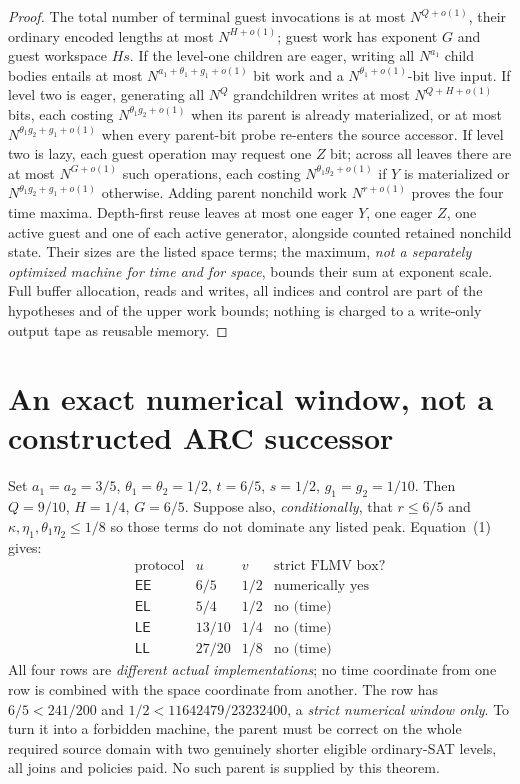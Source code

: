 \documentclass[11pt]{article}
\newcommand{\EE}{\mathsf{EE}}
\newcommand{\EL}{\mathsf{EL}}
\newcommand{\LE}{\mathsf{LE}}
\newcommand{\LL}{\mathsf{LL}}
\begin{document}
\begin{proof}
The total number of terminal guest invocations is at most
$N^{Q+o(1)}$, their ordinary encoded lengths at most
$N^{H+o(1)}$; guest work has exponent $G$ and guest workspace
$Hs$. If the level-one children are eager,
writing all $N^{a_1}$ child bodies entails at most
$N^{a_1+\theta_1+g_1+o(1)}$ bit work and a
$N^{\theta_1+o(1)}$-bit live input.
If level two is eager, generating all
$N^Q$ grandchildren writes at most $N^{Q+H+o(1)}$
bits, each costing $N^{\theta_1g_2+o(1)}$
when its parent is already materialized, or at most
$N^{\theta_1g_2+g_1+o(1)}$ when every parent-bit
probe re-enters the source accessor.
If level two is lazy, each guest operation may request
one $Z$ bit; across all leaves there are at most
$N^{G+o(1)}$ such operations, each costing
$N^{\theta_1g_2+o(1)}$ if $Y$ is materialized or
$N^{\theta_1g_2+g_1+o(1)}$ otherwise.
Adding parent nonchild work $N^{r+o(1)}$
proves the four time maxima. Depth-first reuse leaves
at most one eager $Y$, one eager $Z$, one active
guest and one of each active generator, alongside
counted retained nonchild state. Their sizes are the
listed space terms; the maximum, \emph{not a
separately optimized machine for time and for space},
bounds their sum at exponent scale. Full buffer
allocation, reads and writes, all indices and control
are part of the hypotheses and of the upper work
bounds; nothing is charged to a write-only
output tape as reusable memory.
\end{proof}

\section*{An exact numerical window, not a constructed ARC successor}
Set $a_1=a_2=3/5$, $\theta_1=\theta_2=1/2$,
$t=6/5$, $s=1/2$, $g_1=g_2=1/10$.
Then $Q=9/10$, $H=1/4$, $G=6/5$.
Suppose also, \emph{conditionally}, that
$r\le6/5$ and $\kappa,\eta_1,\theta_1\eta_2\le1/8$
so those terms do not dominate any listed peak.
Equation~(1) gives:
\[
\begin{array}{c|cc|c}
\text{protocol}&u&v&\text{strict FLMV box?}\\\hline
\EE&6/5&1/2&\text{numerically yes}\\
\EL&5/4&1/2&\text{no (time)}\\
\LE&13/10&1/4&\text{no (time)}\\
\LL&27/20&1/8&\text{no (time)}
\end{array}
\]
All four rows are \emph{different actual implementations};
no time coordinate from one row is combined with the space
coordinate from another. The \EE{} row has
$6/5<241/200$ and $1/2<11642479/23232400$,
a \emph{strict numerical window only}. To turn it into a
forbidden machine, the parent must be correct on the
whole required source domain with two genuinely shorter
eligible ordinary-SAT levels, all joins and policies paid.
No such parent is supplied by this theorem.
\end{document}
